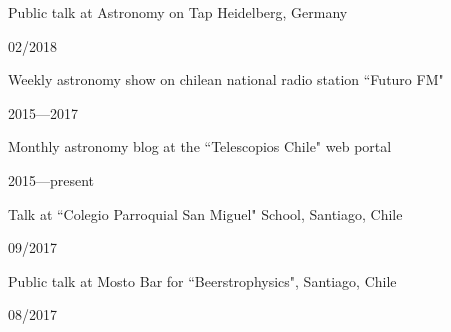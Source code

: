 \documentclass[12pt, a4paper]{article} %
\begin{document}
\begin{minipage}[t]{0.7\textwidth}
\begin{flushleft}%
  \setlength{\leftskip}{0.2cm}%
Public talk at Astronomy on Tap Heidelberg, Germany 
\end{flushleft}
\end{minipage}
\begin{minipage}[t]{0.3\textwidth}
\hfill 02/2018
\end{minipage}

\begin{minipage}[t]{0.7\textwidth}
\begin{flushleft}%
  \setlength{\leftskip}{0.2cm}%
Weekly astronomy show on chilean national radio station ``Futuro FM"
\end{flushleft}
\end{minipage}
\begin{minipage}[t]{0.3\textwidth}
\hfill 2015---2017
\end{minipage}


\begin{minipage}[t]{0.7\textwidth}
\begin{flushleft}%
  \setlength{\leftskip}{0.2cm}%
Monthly astronomy blog at the ``Telescopios Chile" web portal
\end{flushleft}
\end{minipage}
\begin{minipage}[t]{0.3\textwidth}
\hfill 2015---present
\end{minipage}

\begin{minipage}[t]{0.7\textwidth}
\begin{flushleft}%
  \setlength{\leftskip}{0.2cm}%
Talk at ``Colegio Parroquial San Miguel" School, Santiago, Chile
\end{flushleft}
\end{minipage}
\begin{minipage}[t]{0.3\textwidth}
\hfill 09/2017
\end{minipage}

\begin{minipage}[t]{0.7\textwidth}
\begin{flushleft}%
  \setlength{\leftskip}{0.2cm}%
Public talk at Mosto Bar for ``Beerstrophysics", Santiago, Chile
\end{flushleft}
\end{minipage}
\begin{minipage}[t]{0.3\textwidth}
\hfill 08/2017
\end{minipage}
\end{document}
